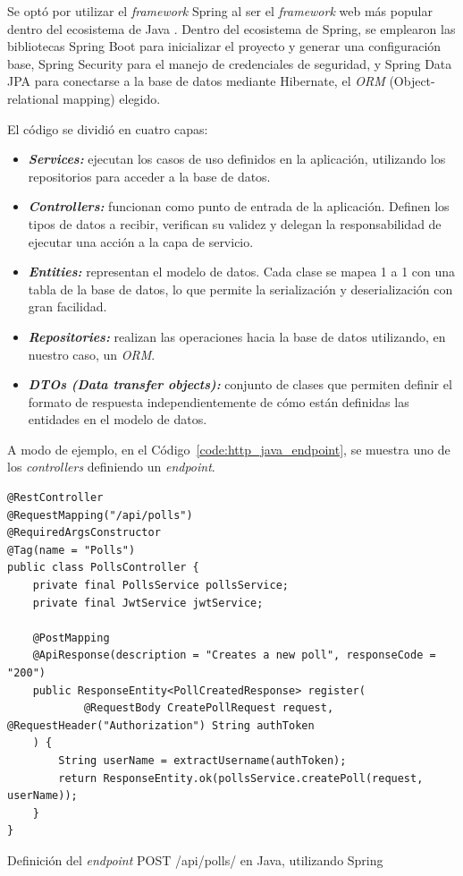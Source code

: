 \documentclass[11pt]{article}
\newcommand{\english}[1]{\textit{#1}}
\newcommand{\technical}[1]{\textit{#1}}
\begin{document}
Se optó por utilizar el \english{framework} Spring al ser el \textit{framework} web más popular dentro del ecosistema de Java \cite{http:java}. Dentro del ecosistema de Spring, se emplearon las bibliotecas Spring Boot para inicializar el proyecto y generar una configuración base, Spring Security para el manejo de credenciales de seguridad, y Spring Data JPA para conectarse a la base de datos mediante Hibernate, el \textit{ORM} (Object-relational mapping) elegido.

El código se dividió en cuatro capas:

\begin{itemize}
    \item \textbf{\technical{Services:}} ejecutan los casos de uso definidos en la aplicación, utilizando los repositorios para acceder a la base de datos.
    \item \textbf{\technical{Controllers:}} funcionan como punto de entrada de la aplicación. Definen los tipos de datos a recibir, verifican su validez y delegan la responsabilidad de ejecutar una acción a la capa de servicio.
    \item \textbf{\technical{Entities:}} representan el modelo de datos. Cada clase se mapea 1 a 1 con una tabla de la base de datos, lo que permite la serialización y deserialización con gran facilidad.
    \item \textbf{\technical{Repositories:}} realizan las operaciones hacia la base de datos utilizando, en nuestro caso, un \textit{ORM}.
    \item \textbf{\technical{DTOs (Data transfer objects):}} conjunto de clases que permiten definir el formato de respuesta independientemente de cómo están definidas las entidades en el modelo de datos.
\end{itemize}

A modo de ejemplo, en el Código~\ref{code:http_java_endpoint}, se muestra uno de los \english{controllers} definiendo un \english{endpoint}.

\begin{listing}
\begin{verbatim}
@RestController
@RequestMapping("/api/polls")
@RequiredArgsConstructor
@Tag(name = "Polls")
public class PollsController {
    private final PollsService pollsService;
    private final JwtService jwtService;

    @PostMapping
    @ApiResponse(description = "Creates a new poll", responseCode = "200")
    public ResponseEntity<PollCreatedResponse> register(
            @RequestBody CreatePollRequest request, @RequestHeader("Authorization") String authToken
    ) {
        String userName = extractUsername(authToken);
        return ResponseEntity.ok(pollsService.createPoll(request, userName));
    }
}
\end{verbatim}
\caption{Definición del \english{endpoint} POST /api/polls/ en Java, utilizando Spring}
\label{code:http_java_endpoint}
\end{listing}
\end{document}
